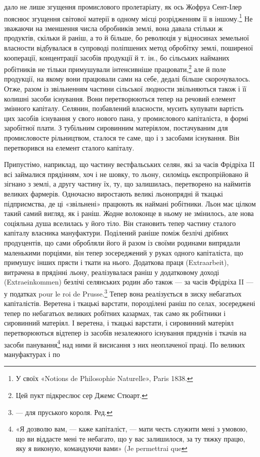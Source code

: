 дало не лише згущення промислового пролетаріату, як ось Жофруа
Сент-Ілер пояснює згущення світової матерії в одному
місці розрідженням її в іншому.\footnote{
У своїх «Notions de Philosophie Naturelle», Paris 1838.
} Не зважаючи на зменшення
числа обробників землі, вона давала стільки ж продуктів, скільки
й раніш, а то й більше, бо революція у відносинах земельної
власности відбувалася в супроводі поліпшених метод обробітку
землі, поширеної кооперації, концентрації засобів продукції й
т. ін., бо сільських найманих робітників не тільки примушували
інтенсивніше працювати,\footnote{
Цей пукт підкреслює сер Джемс Стюарт.
} але й поле продукції, на якому
вони працювали сами на себе, дедалі більше скорочувалось.
Отже, разом із звільненням частини сільської людности звільняються
також і її колишні засоби існування. Вони перетворюються
тепер на речовий елемент змінного капіталу. Селянин,
позбавлений власности, мусить купувати вартість цих засобів
існування у свого нового пана, у промислового капіталіста, в
формі заробітної плати. З тубільним сировинним матеріялом,
постачуваним для промисловосте рільництвом, сталося те саме,
що і з засобами існування. Він перетворився на елемент сталого
капіталу.

Припустімо, наприклад, що частину вестфальських селян,
які за часів Фрідріха II всі займалися прядінням, хоч і не шовку,
то льону, силоміць експропрійовано й зігнано з землі, а другу
частину їх, ту, що залишилась, перетворено на наймитів великих
фармерів. Одночасно виростають великі льонопрядні й ткацькі
підприємства, де ці «звільнені» працюють як наймані робітники.
Льон має цілком такий самий вигляд, як і раніш. Жодне волоконце
в ньому не змінилось, але нова соціяльна душа вселилась
у його тіло. Він становить тепер частину сталого капіталу власника
мануфактури. Поділений раніше поміж безлічі дрібних
продуцентів, що сами обробляли його й разом із своїми родинами
випрядали маленькими порціями, він тепер зосереджений у руках
одного капіталіста, що примушує інших прясти і ткати на
нього. Додаткова праця (Extraarbeit), витрачена в прядінні
льону, реалізувалася раніш у додатковому доході (Extraeinkommen)
безлічі селянських родин або також — за часів Фрідріха
II — у податках pour le roi de Prusse.\footnote*{
— для пруського короля. Ред.
} Тепер вона реалізується
в зиску небагатьох капіталістів. Веретена і ткацькі варстати,
порозділені раніш по селах, зосереджені тепер по небагатьох
великих робітних казармах, так само як робітники і сировинний
матеріял. І веретена, і ткацькі варстати, і сировинний
матеріял перетворюються відтепер із засобів незалежного існування
прядунів і ткачів на засоби панування\footnote{
«Я дозволю вам, — каже капіталіст, — мати честь служити мені
з умовою, що ви віддасте мені те небагато, що у вас залишилося, за ту
тяжку працю, яку я виконую, командуючи вами» (Je permettrai que
} над ними й висисання
з них неоплаченої праці. По великих мануфактурах і по